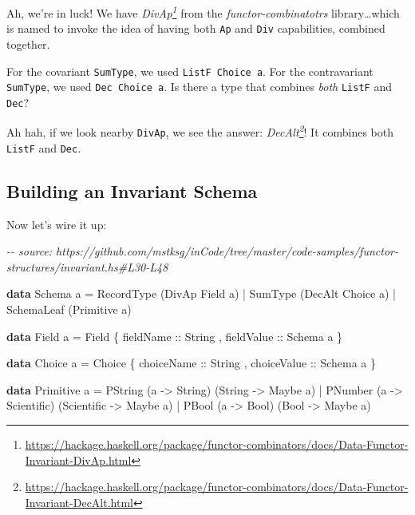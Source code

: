\documentclass[]{article}
\newenvironment{Shaded}{}{}
\newcommand{\CommentTok}[1]{\textcolor[rgb]{0.38,0.63,0.69}{\textit{#1}}}
\newcommand{\DataTypeTok}[1]{\textcolor[rgb]{0.56,0.13,0.00}{#1}}
\newcommand{\KeywordTok}[1]{\textcolor[rgb]{0.00,0.44,0.13}{\textbf{#1}}}
\newcommand{\NormalTok}[1]{#1}
\newcommand{\OperatorTok}[1]{\textcolor[rgb]{0.40,0.40,0.40}{#1}}
\newcommand{\OtherTok}[1]{\textcolor[rgb]{0.00,0.44,0.13}{#1}}
\renewcommand{\href}[2]{#2\footnote{\url{#1}}}
\begin{document}
Ah, we're in luck! We have
\emph{\href{https://hackage.haskell.org/package/functor-combinators/docs/Data-Functor-Invariant-DivAp.html}{DivAp}}
from the \emph{functor-combinatotrs} library\ldots which is named to invoke the
idea of having both \texttt{Ap} and \texttt{Div} capabilities, combined
together.

For the covariant \texttt{SumType}, we used \texttt{ListF\ Choice\ a}. For the
contravariant \texttt{SumType}, we used \texttt{Dec\ Choice\ a}. Is there a type
that combines \emph{both} \texttt{ListF} and \texttt{Dec}?

Ah hah, if we look nearby \texttt{DivAp}, we see the answer:
\emph{\href{https://hackage.haskell.org/package/functor-combinators/docs/Data-Functor-Invariant-DecAlt.html}{DecAlt}}!
It combines both \texttt{ListF} and \texttt{Dec}.

\hypertarget{building-an-invariant-schema}{%
\subsection{Building an Invariant Schema}\label{building-an-invariant-schema}}

Now let's wire it up:

\begin{Shaded}
\begin{Highlighting}[]
\CommentTok{{-}{-} source: https://github.com/mstksg/inCode/tree/master/code{-}samples/functor{-}structures/invariant.hs\#L30{-}L48}

\KeywordTok{data} \DataTypeTok{Schema}\NormalTok{ a }\OtherTok{=}
      \DataTypeTok{RecordType}\NormalTok{  (}\DataTypeTok{DivAp}   \DataTypeTok{Field}\NormalTok{  a)}
    \OperatorTok{|} \DataTypeTok{SumType}\NormalTok{     (}\DataTypeTok{DecAlt} \DataTypeTok{Choice}\NormalTok{ a)}
    \OperatorTok{|} \DataTypeTok{SchemaLeaf}\NormalTok{  (}\DataTypeTok{Primitive}\NormalTok{ a)}

\KeywordTok{data} \DataTypeTok{Field}\NormalTok{ a }\OtherTok{=} \DataTypeTok{Field}
\NormalTok{    \{}\OtherTok{ fieldName  ::} \DataTypeTok{String}
\NormalTok{    ,}\OtherTok{ fieldValue ::} \DataTypeTok{Schema}\NormalTok{ a}
\NormalTok{    \}}

\KeywordTok{data} \DataTypeTok{Choice}\NormalTok{ a }\OtherTok{=} \DataTypeTok{Choice}
\NormalTok{    \{}\OtherTok{ choiceName  ::} \DataTypeTok{String}
\NormalTok{    ,}\OtherTok{ choiceValue ::} \DataTypeTok{Schema}\NormalTok{ a}
\NormalTok{    \}}

\KeywordTok{data} \DataTypeTok{Primitive}\NormalTok{ a }\OtherTok{=}
      \DataTypeTok{PString}\NormalTok{ (a }\OtherTok{{-}>} \DataTypeTok{String}\NormalTok{)     (}\DataTypeTok{String}     \OtherTok{{-}>} \DataTypeTok{Maybe}\NormalTok{ a)}
    \OperatorTok{|} \DataTypeTok{PNumber}\NormalTok{ (a }\OtherTok{{-}>} \DataTypeTok{Scientific}\NormalTok{) (}\DataTypeTok{Scientific} \OtherTok{{-}>} \DataTypeTok{Maybe}\NormalTok{ a)}
    \OperatorTok{|} \DataTypeTok{PBool}\NormalTok{   (a }\OtherTok{{-}>} \DataTypeTok{Bool}\NormalTok{)       (}\DataTypeTok{Bool}       \OtherTok{{-}>} \DataTypeTok{Maybe}\NormalTok{ a)}
\end{Highlighting}
\end{Shaded}
\end{document}
